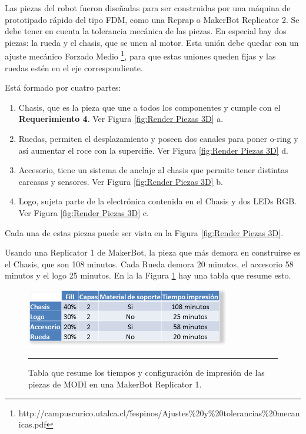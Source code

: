 Las piezas del robot fueron diseñadas para ser construidas por una máquina de prototipado rápido del tipo FDM, como una Reprap o MakerBot Replicator 2. Se debe tener en cuenta la tolerancia mecánica de las piezas. En especial hay dos piezas: la rueda y el chasis, que se unen al motor. Esta unión debe quedar con un ajuste mecánico Forzado Medio \footnote{http://campuscurico.utalca.cl/\~ fespinos/Ajustes\%20y\%20tolerancias\%20mecanicas.pdf}, para que estas uniones queden fijas y las ruedas estén en el eje correspondiente.

Está formado por cuatro partes:

\begin{enumerate}
\item Chasis, que es la pieza que une a todos los componentes y cumple con el \textbf{Requerimiento 4}. Ver Figura \ref{fig:Render Piezas 3D} a.
\item Ruedas, permiten el desplazamiento y poseen dos canales para poner o-ring y así aumentar el roce con la supercifie. Ver Figura \ref{fig:Render Piezas 3D} d.
\item Accesorio, tiene un sistema de anclaje al chasis que permite tener distintas carcasas y sensores. Ver Figura \ref{fig:Render Piezas 3D} b.
\item Logo,  sujeta parte de la electrónica contenida en el Chasis y dos LEDs RGB. Ver Figura \ref{fig:Render Piezas 3D} c.
\end{enumerate}

Cada una de estas piezas puede ser vista en la Figura \ref{fig:Render Piezas 3D}.

Usando una Replicator 1 de MakerBot, la pieza que más demora en construirse es el Chasis, que son 108 minutos. Cada Rueda demora 20 minutos, el accesorio 58 minutos y el logo 25 minutos. En la la Figura \ref{fig:tabla impresion} hay una tabla que resume esto.

\begin{figure}[htbp]
	\centering
		\includegraphics[width=0.8\textwidth]{./Figures/MODI/tablaimpresion.png}
		\rule{35em}{0.5pt}
	\caption[Tabla impresion]{Tabla que resume los tiempos y configuración de impresión de las piezas de MODI en una MakerBot Replicator 1.}
	\label{fig:tabla impresion}
\end{figure}

